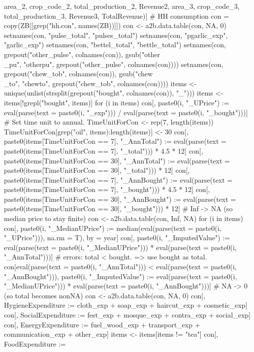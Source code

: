 \begin{Schunk}
\begin{Sinput}
  area_2, crop_code_2, total_production_2, Revenue2, 
  area_3, crop_code_3, total_production_3, Revenue3, TotalRevenue)]
# HH consumption
con = copy(ZB[[grep("hh.con", names(ZB))]])
con <- a2b.data.table(con, NA, 0)
setnames(con, "pulse_total", "pulses_total")
setnames(con, "pgarlic_exp", "garlic_exp")
setnames(con, "bettel_total", "bettle_total")
setnames(con, grepout("other_pulse", colnames(con)), 
  gsub("other\\_pu", "otherpu", grepout("other_pulse", colnames(con))))
setnames(con, grepout("chew_tob", colnames(con)), 
  gsub("chew\\_to", "chewto", grepout("chew_tob", colnames(con))))
items <- unique(unlist(strsplit(grepout("bought", colnames(con)), "_")))
items <- items[!grepl("bought", items)]
for (i in items) {
  con[, paste0(i, "_UPrice") := 
    eval(parse(text = paste0(i, "_exp"))) / eval(parse(text = paste0(i, "_bought")))]
}
# Set time unit to annual.
TimeUnitForCon <- rep(7, length(items))
TimeUnitForCon[grep("oil", items):length(items)] <- 30
con[, paste0(items[TimeUnitForCon == 7], "_AnnTotal") := 
  eval(parse(text = paste0(items[TimeUnitForCon == 7], "_total"))) * 4.5 * 12]
con[, paste0(items[TimeUnitForCon == 30], "_AnnTotal") := 
  eval(parse(text = paste0(items[TimeUnitForCon == 30], "_total"))) * 12]
con[, paste0(items[TimeUnitForCon == 7], "_AnnBought") := 
  eval(parse(text = paste0(items[TimeUnitForCon == 7], "_bought"))) * 4.5 * 12]
con[, paste0(items[TimeUnitForCon == 30], "_AnnBought") := 
  eval(parse(text = paste0(items[TimeUnitForCon == 30], "_bought"))) * 12]
# Inf -> NA (so median price to stay finite)
con <- a2b.data.table(con, Inf, NA)
for (i in items) {
  con[, paste0(i, "_MedianUPrice") := 
    median(eval(parse(text = paste0(i, "_UPrice"))), na.rm = T), by = year]
  con[, paste0(i, "_ImputedValue") := 
    eval(parse(text = paste0(i, "_MedianUPrice"))) * 
      eval(parse(text = paste0(i, "_AnnTotal")))]
  # errors: total < bought. => use bought as total.
  con[eval(parse(text = paste0(i, "_AnnTotal"))) < eval(parse(text = paste0(i, "_AnnBought"))), 
    paste0(i, "_ImputedValue") := 
      eval(parse(text = paste0(i, "_MedianUPrice"))) * 
      eval(parse(text = paste0(i, "_AnnBought")))]
}
# NA -> 0 (so total becomes nonNA)
con <- a2b.data.table(con, NA, 0)
con[, HygieneExpenditure := cloth_exp + soap_exp + haircut_exp + cosmetic_exp]
con[, SocialExpenditure := fest_exp + mosque_exp + contra_exp + social_exp]
con[, EnergyExpenditure := fuel_wood_exp + transport_exp + communication_exp + other_exp]
items <- items[items != "tea"]
con[, FoodExpenditure := 

\end{Sinput}
\end{Schunk}
